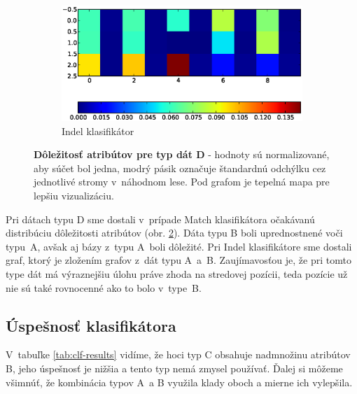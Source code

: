 \begin{figure}[htbp]
\begin{subfigure}[t]{0.4\textwidth}
                \includegraphics[width=\textwidth]{images/clf_fi/randomforest_combined_5_indel_heatmap}
                \caption{Indel klasifikátor}
                \label{fig:datatype4-i}
        \end{subfigure}
        \caption[Dôležitosť atribútov pre typ dát D]{
        \textbf{Dôležitosť atribútov pre typ dát D} - hodnoty sú normalizované, aby súčet bol jedna, modrý pásik označuje štandardnú odchýlku cez jednotlivé stromy v~náhodnom lese.
        Pod grafom je tepelná mapa pre lepšiu vizualizáciu.}
        \label{fig:datatype4}
\end{figure}

Pri dátach typu D sme dostali v~prípade Match klasifikátora očakávanú distribúciu dôležitosti atribútov (obr. \ref{fig:datatype4}). Dáta typu B boli uprednostnené voči typu~A, avšak aj bázy z~typu A~boli dôležité. Pri Indel klasifikátore sme dostali graf, ktorý je zložením grafov z~dát typu A~a~B. Zaujímavosťou je, že pri tomto type dát má výraznejšiu úlohu práve zhoda na stredovej pozícii, teda pozície už nie sú také rovnocenné ako to bolo v~type~B.

\FloatBarrier

\subsection{Úspešnosť klasifikátora}

V~tabuľke \ref{tab:clf-results} vidíme, že hoci typ C obsahuje nadmnožinu atribútov B, jeho úspešnosť je nižšia a tento typ nemá zmysel používať. Ďalej si môžeme všimnúť, že kombinácia typov A~a B využila klady oboch a mierne ich vylepšila.

